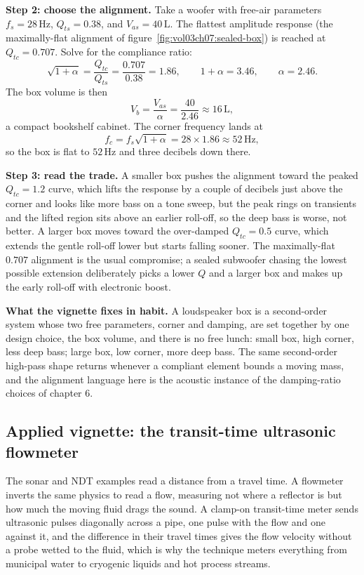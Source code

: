 \textbf{Step 2: choose the alignment.} Take a woofer with free-air
parameters $f_s = 28\,\si{\hertz}$, $Q_{ts} = 0.38$, and $V_{as} =
40\,\si{\liter}$. The flattest amplitude response (the maximally-flat
alignment of figure~\ref{fig:vol03ch07:sealed-box}) is reached at
$Q_{tc} = 0.707$. Solve for the compliance ratio:
\[
\sqrt{1+\alpha} = \frac{Q_{tc}}{Q_{ts}} = \frac{0.707}{0.38} = 1.86,
\qquad 1+\alpha = 3.46, \qquad \alpha = 2.46.
\]
The box volume is then
\[
V_b = \frac{V_{as}}{\alpha} = \frac{40}{2.46} \approx 16\,\si{\liter},
\]
a compact bookshelf cabinet. The corner frequency lands at
\[
f_c = f_s\sqrt{1+\alpha} = 28\times 1.86 \approx 52\,\si{\hertz},
\]
so the box is flat to $52\,\si{\hertz}$ and three decibels down there.

\textbf{Step 3: read the trade.} A smaller box pushes the alignment toward
the peaked $Q_{tc} = 1.2$ curve, which lifts the response by a couple of
decibels just above the corner and looks like more bass on a tone sweep,
but the peak rings on transients and the lifted region sits above an
earlier roll-off, so the deep bass is worse, not better. A larger box
moves toward the over-damped $Q_{tc} = 0.5$ curve, which extends the gentle
roll-off lower but starts falling sooner. The maximally-flat $0.707$
alignment is the usual compromise; a sealed subwoofer chasing the lowest
possible extension deliberately picks a lower $Q$ and a larger box and
makes up the early roll-off with electronic boost.

\textbf{What the vignette fixes in habit.} A loudspeaker box is a
second-order system whose two free parameters, corner and damping, are set
together by one design choice, the box volume, and there is no free lunch:
small box, high corner, less deep bass; large box, low corner, more deep
bass. The same second-order high-pass shape returns whenever a compliant
element bounds a moving mass, and the alignment language here is the
acoustic instance of the damping-ratio choices of chapter 6.



\subsection{Applied vignette: the transit-time ultrasonic flowmeter}

The sonar and NDT examples read a distance from a travel time. A flowmeter
inverts the same physics to read a flow, measuring not where a reflector is
but how much the moving fluid drags the sound. A clamp-on transit-time meter
sends ultrasonic pulses diagonally across a pipe, one pulse with the flow and
one against it, and the difference in their travel times gives the flow
velocity without a probe wetted to the fluid, which is why the technique
meters everything from municipal water to cryogenic liquids and hot process
streams.

